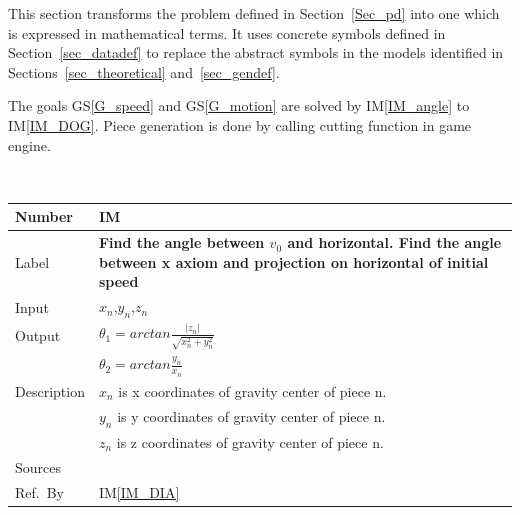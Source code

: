 \documentclass[12pt]{article}
\newcommand{\colAwidth}{0.13\textwidth}
\newcommand{\colBwidth}{0.82\textwidth}
\newcommand{\gsref}[1]{GS\ref{#1}}
\newcounter{instnum} %
\newcommand{\iref}[1]{IM\ref{#1}}
\begin{document}
This section transforms the problem defined in Section~\ref{Sec_pd} into 
one which is expressed in mathematical terms. It uses concrete symbols defined 
in Section~\ref{sec_datadef} to replace the abstract symbols in the models 
identified in Sections~\ref{sec_theoretical} and~\ref{sec_gendef}.

The goals \gsref{G_speed} and \gsref{G_motion} are solved by \iref{IM_angle} to \iref{IM_DOG}.
Piece generation is done by calling cutting function in game engine.   

~\newline


\noindent
\begin{minipage}{\textwidth}
	\renewcommand*{\arraystretch}{1.5}
	\begin{tabular}{| p{\colAwidth} | p{\colBwidth}|}
		\hline
		\rowcolor[gray]{0.9}
		Number& IM{instnum}\theinstnum \label{IM_angle}\\
		\hline
		Label& \bf Find the angle between $v_{0}$ and horizontal. Find the angle between x axiom and projection on horizontal of initial speed \\
		\hline
		Input&$x_{n}$,$y_{n}$,$z_{n}$\\
		\hline
		Output&$\theta_{1}=arctan \frac{|z_{n}|}{\sqrt{x_{n}^2+y_{n}^2}}$\\
		&$\theta_{2}=arctan \frac{y_{n}}{x_{n}}$\\
		\hline
		Description&$x_{n}$ is x coordinates of gravity center of piece n.\\
		&$y_{n}$ is y coordinates of gravity center of piece n.\\
		&$z_{n}$ is z coordinates of gravity center of piece n.\\
		\hline
		Sources&~\ \ \\
		\hline
		Ref.\ By & \iref{IM_DIA}\\
		\hline
	\end{tabular}
\end{minipage}\\

~\newline
\end{document}
